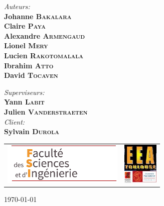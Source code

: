 \begin{titlepage}
\begin{center}
\begin{minipage}{0.4\textwidth}
\begin{flushleft} \large
\emph{Auteurs:}\\
\textbf{Johanne \textsc{Bakalara}}\\
\textbf{Claire \textsc{Paya}}\\
\textbf{Alexandre \textsc{Armengaud}}\\
\textbf{Lionel \textsc{Mery}}\\
\textbf{Lucien \textsc{Rakotomalala}}\\
\textbf{Ibrahim \textsc{Atto}}\\
\textbf{David \textsc{Tocaven}}\\
\end{flushleft}
\end{minipage}
\begin{minipage}{0.4\textwidth}
\begin{flushright} \large
\emph{Superviseurs:} \\
\textbf{ Yann \textsc{Labit}}\\
\textbf{Julien \textsc{Vanderstraeten}}\\
 \vspace{1cm}
\emph{Client:} \\
\textbf{Sylvain \textsc{Durola}}
\end{flushright}
\end{minipage}
\newline
\newline


\vfill


\begin{tabular}{cc}
   \includegraphics[height=2cm]{./Page_de_garde/logo_fsi.png} &
   \includegraphics[height=2cm]{./Page_de_garde/logo_eea.jpg} \\
\end{tabular}

{\large \today}

\end{center}
\end{titlepage}